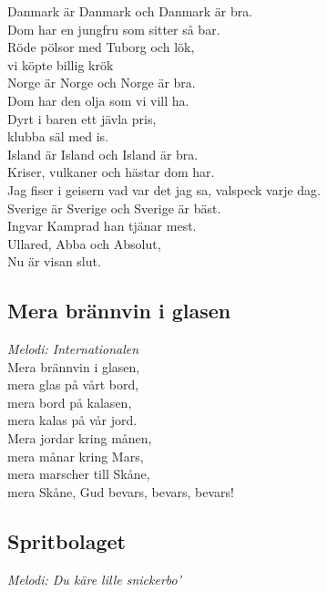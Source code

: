 \documentclass[a5paper]{article}
\begin{document}
\noindent 
Danmark är Danmark och Danmark är bra. \\
Dom har en jungfru som sitter så bar. \\
Röde pölsor med Tuborg och lök, \\
vi köpte billig krök \\

\noindent 
Norge är Norge och Norge är bra. \\
Dom har den olja som vi vill ha. \\
Dyrt i baren ett jävla pris, \\
klubba säl med is. \\

\noindent 
Island är Island och Island är bra. \\
Kriser, vulkaner och hästar dom har. \\
Jag fiser i geisern vad var det jag sa, valspeck varje dag. \\

\noindent 
Sverige är Sverige och Sverige är bäst. \\
Ingvar Kamprad han tjänar mest. \\
Ullared, Abba och Absolut, \\
Nu är visan slut. \\


\subsection{Mera brännvin i glasen}
\textit{Melodi: Internationalen} \\

\noindent
Mera brännvin i glasen, \\
mera glas på vårt bord, \\
mera bord på kalasen, \\
mera kalas på vår jord. \\
 
\noindent
Mera jordar kring månen, \\
mera månar kring Mars, \\
mera marscher till Skåne, \\
mera Skåne, Gud bevars, bevars, bevars! \\


\newpage
\subsection{Spritbolaget}

\textit{Melodi: Du käre lille snickerbo’} \\
\end{document}
